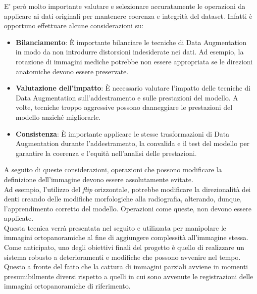 \documentclass[12pt,a4paper,openright,twoside]{book}
\begin{document}
E' però molto importante valutare e selezionare accuratamente le operazioni da applicare ai dati originali per mantenere coerenza e integrità del dataset. Infatti è opportuno effettuare alcune considerazioni su:
\begin{itemize}
\item \textbf{Bilanciamento}: È importante bilanciare le tecniche di Data Augmentation in modo da non introdurre distorsioni indesiderate nei dati. Ad esempio, la rotazione di immagini mediche potrebbe non essere appropriata se le direzioni anatomiche devono essere preservate.

\item \textbf{Valutazione dell'impatto}: È necessario valutare l'impatto delle tecniche di Data Augmentation sull'addestramento e sulle prestazioni del modello. A volte, tecniche troppo aggressive possono danneggiare le prestazioni del modello anziché migliorarle.

\item \textbf{Consistenza}: È importante applicare le stesse trasformazioni di Data Augmentation durante l'addestramento, la convalida e il test del modello per garantire la coerenza e l'equità nell'analisi delle prestazioni.
\end{itemize}

A seguito di queste considerazioni, operazioni che possono modificare la definizione dell'immagine devono essere assolutamente evitate.\\
Ad esempio, l'utilizzo del {\itshape flip} orizzontale, potrebbe modificare la direzionalità dei denti creando delle modifiche morfologiche alla radiografia, alterando, dunque,  l'apprendimento corretto del modello. Operazioni come queste, non devono essere applicate.\\

Questa tecnica verrà presentata nel seguito e utilizzata per manipolare le immagini ortopanoramiche al fine di aggiungere complessità all'immagine stessa. Come anticipato, uno degli obiettivi finali del progetto è quello di realizzare un sistema robusto a deterioramenti e modifiche che possono avvenire nel tempo. Questo a fronte del fatto che la cattura di immagini parziali avviene in momenti presumibilmente diversi rispetto a quelli in cui sono avvenute le registrazioni delle immagini ortopanoramiche di riferimento.

\end{document}
